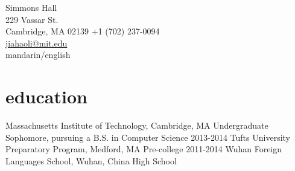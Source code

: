 \documentclass[]{friggeri-cv} %
\begin{document}
{Simmons Hall\\
229 Vassar St.\\
Cambridge, MA 02139}
{+1 (702) 237-0094\\
\href{mailto:jiahaoli@mit.edu}{jiahaoli@mit.edu}\\
mandarin/english} %




\section{education}

\begin{entrylist}
{Massachusetts Institute of Technology, Cambridge, MA}
{Undergraduate}
{Sophomore, pursuing a B.S. in Computer Science}
\sentry
{2013-2014}
{Tufts University Preparatory Program, Medford, MA}
{Pre-college}
\sentry
{2011-2014}
{Wuhan Foreign Languages School, Wuhan, China}
{High School}
\end{entrylist}
\end{document}
